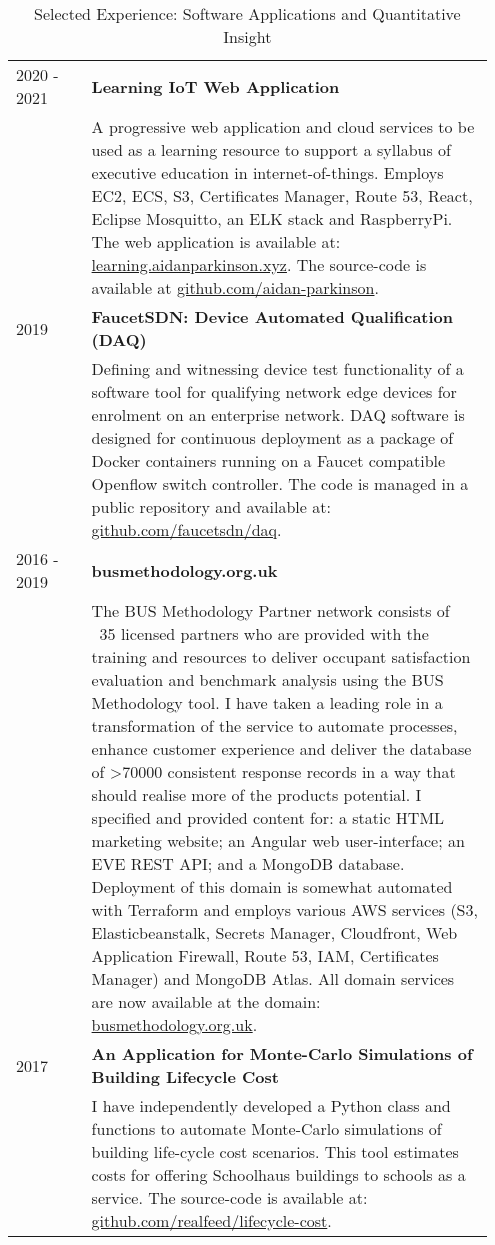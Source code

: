 \documentclass[11pt, oneside]{article}   	%
\begin{document}
\begin{table}[h]
\caption*{Selected Experience: Software Applications and Quantitative Insight}
\vspace{-5mm}
\small
\begin{center}
\begin{tabular}{p{0.15\linewidth} p{0.8\linewidth}}
\hline
2020 - 2021 &\textbf{Learning IoT Web Application} \\
&A progressive web application and cloud services to be used as a learning resource to support a syllabus of executive education in internet-of-things. Employs EC2, ECS, S3, Certificates Manager, Route 53, React, Eclipse Mosquitto, an ELK stack and RaspberryPi. The web application is available at: \url{learning.aidanparkinson.xyz}. The source-code is available at \url{github.com/aidan-parkinson}. \\
2019&\textbf{FaucetSDN: Device Automated Qualification (DAQ)} \\
&Defining and witnessing device test functionality of a software tool for qualifying network edge devices for enrolment on an enterprise network. DAQ software is designed for continuous deployment as a package of Docker containers running on a Faucet compatible Openflow switch controller. The code is managed in a public repository and available at: \url{github.com/faucetsdn/daq}. \\
2016 - 2019&\textbf{busmethodology.org.uk} \\
&The BUS Methodology Partner network consists of ~35 licensed partners who are provided with the training and resources to deliver occupant satisfaction evaluation and benchmark analysis using the BUS Methodology tool. I have taken a leading role in a transformation of the service to automate processes, enhance customer experience and deliver the database of >70000 consistent response records in a way that should realise more of the products potential. I specified and provided content for: a static HTML marketing website; an Angular web user-interface; an EVE REST API; and a MongoDB database. Deployment of this domain is somewhat automated with Terraform and employs various AWS services (S3, Elasticbeanstalk, Secrets Manager, Cloudfront, Web Application Firewall, Route 53, IAM, Certificates Manager) and MongoDB Atlas. All domain services are now available at the domain: \url{busmethodology.org.uk}. \\
2017&\textbf{An Application for Monte-Carlo Simulations of Building Lifecycle Cost} \\
&I have independently developed a Python class and functions to automate Monte-Carlo simulations of building life-cycle cost scenarios. This tool estimates costs for offering Schoolhaus buildings to schools as a service. The source-code is available at: \url{github.com/realfeed/lifecycle-cost}. \\

\end{tabular}
\end{center}
\end{table}
\end{document}
